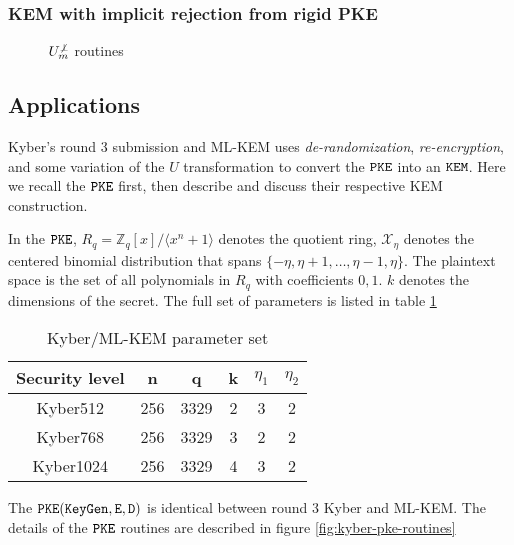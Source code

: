 \documentclass{article}
\begin{document}
\subsubsection{KEM with implicit rejection from rigid PKE}
\begin{figure}[H]
    \caption{$U^{\not\bot}_m$ routines}\label{fig:u-notbot-m-routines}
\end{figure}

\subsection{Applications}
Kyber's round 3 submission \cite{avanzi2019crystals} and ML-KEM \cite{key2023mechanism} uses \emph{de-randomization}, \emph{re-encryption}, and some variation of the $U$ transformation to convert the  $\texttt{PKE}$ into an  $\texttt{KEM}$. Here we recall the  $\texttt{PKE}$ first, then describe and discuss their respective KEM construction.

In the $\texttt{PKE}$, $R_q = \mathbb{Z}_q[x]/\langle x^n + 1 \rangle$ denotes the quotient ring, $\mathcal{X}_\eta$ denotes the centered binomial distribution that spans $\{-\eta, \eta+1, \ldots, \eta-1, \eta\}$. The plaintext space is the set of all polynomials in $R_q$ with coefficients $0, 1$. $k$ denotes the dimensions of the secret. The full set of parameters is listed in table \ref{tbl:kyber-params}

\begin{table}[H]
    \center
    \begin{tabular}{|c|c|c|c|c|c|}
        \hline
        Security level & n & q & k & $\eta_1$ & $\eta_2$ \\
        \hline
        Kyber512 & 256 & 3329 & 2 & 3 & 2 \\
        \hline
        Kyber768 & 256 & 3329 & 3 & 2 & 2 \\
        \hline
        Kyber1024 & 256 & 3329 & 4 & 3 & 2 \\
        \hline
    \end{tabular}
    \caption{Kyber/ML-KEM parameter set}\label{tbl:kyber-params}
\end{table}

The  $\texttt{PKE}(\texttt{KeyGen}, \texttt{E}, \texttt{D})$ is identical between round 3 Kyber and ML-KEM. The details of the $\texttt{PKE}$ routines are described in figure \ref{fig:kyber-pke-routines}
\end{document}
